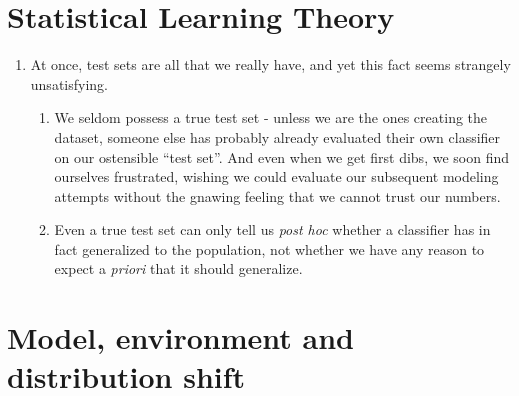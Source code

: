 \section{Statistical Learning Theory \cite{dnn-1}} \label{story: Statistical Learning Theory}

\begin{fontSizeEnv}{8pt}

\begin{enumerate}
    \item At once, test sets are all that we really have, and yet this fact seems strangely unsatisfying. 
    \begin{enumerate}
        \item We seldom possess a true test set - unless we are the ones creating the dataset, someone else has probably already evaluated their own classifier on our ostensible “test set”. And even when we get first dibs, we soon find ourselves frustrated, wishing we could evaluate our subsequent modeling attempts without the gnawing feeling that we cannot trust our numbers.

        \item Even a true test set can only tell us \textit{post hoc} whether a classifier has in fact generalized to the population, not whether we have any reason to expect a \textit{priori} that it should generalize.

    \end{enumerate}

\end{enumerate}

\end{fontSizeEnv}

\section{Model, environment and distribution shift \cite{dnn-1}} \label{story: Model, environment and distribution shift}

